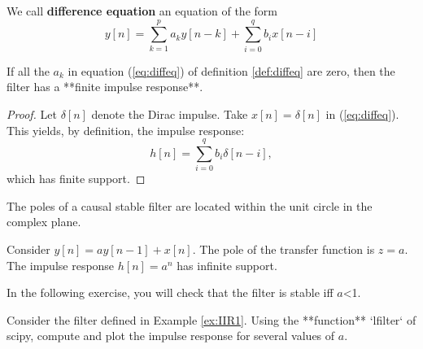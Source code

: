     \begin{listing}
\begin{definition} \label{def:diffeq}
We call \textbf{difference equation} an equation of the form
$$
\label{eq:diffeq}
y[n]= \sum_{k=1}^{p} a_k y[n-k] + \sum_{i=0}^q b_i x[n-i]
$$
\end{definition}

\begin{property}
If all the $a_k$ in equation (\ref{eq:diffeq}) of definition \ref{def:diffeq} are zero, then the filter has a **finite impulse response**. 
\end{property}

\begin{proof}
Let $\delta[n]$ denote the Dirac impulse. Take $x[n]=\delta[n]$ in (\ref{eq:diffeq}). This yields, by definition, the impulse response:
$$
\label{eq:fir}
h[n]= \sum_{i=0}^q b_i \delta[n-i],
$$
which has finite support. 
\end{proof}

\begin{theorem}
The poles of a causal stable filter are located within the unit circle in the complex plane.
\end{theorem}

\begin{example} \label{ex:IIR1}
Consider $y[n]= a y[n-1] +  x[n]$. The pole of the transfer function is $z=a$. The impulse response $h[n]=a^n$ has infinite support.
\end{example}

In the following exercise, you will check that the filter is stable iff $a$<1.

\begin{exercise}\label{ex:exofilter}
Consider the filter defined in Example \ref{ex:IIR1}. Using the **function** `lfilter` of scipy, compute and plot the impulse response for several values of $a$.
\end{exercise}

\end{listing}

